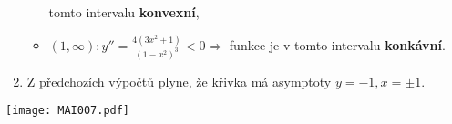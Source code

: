 \begin{example}
\begin{enumerate}
\begin{itemize}
                 tomto intervalu \textbf{konvexní},
           \item $(1,\infty): y''=\frac{4(3x^2+1)}{(1-x^2 )^3} <0 \Rightarrow$ funkce je v tomto  
                 intervalu \textbf{konkáv\-ní}.
         \end{itemize}
    \item Z předchozích výpočtů plyne, že křivka má asymptoty $y=-1,x=\pm1$.
  \end{enumerate}
   {\centering
    \captionsetup{type=figure}
    \texttt{[image: MAI007.pdf]}
    \label{MAI:fig_007}
  \par}
\end{example}